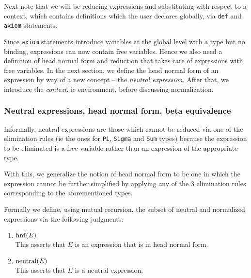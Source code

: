 \documentclass{article}
\begin{document}
Next note that we will be reducing expressions and substituting with
respect to a context, which contains definitions which the user declares
globally, via \verb|def| and \verb|axiom| statements.

Since \verb|axiom| statements introduce variables at the global level with a
type but no binding, expressions can now contain free variables.
Hence we also need a definition of head normal form and reduction
that takes care of expressions with free variables.
In the next section, we define the head normal form of an expression by way of
a new concept -- the \textit{neutral expression}.
After that, we introduce the \textit{context}, ie environment, before 
discussing normalization.





\subsubsection{Neutral expressions, head normal form, beta equivalence}
Informally, neutral expressions are those which cannot be reduced via one of the 
elimination rules (ie the ones for \verb|Pi|, \verb|Sigma| and \verb|Sum| types)
because  the expression to be eliminated is a free variable rather than an
expression of the appropriate type.

With this, we generalize the notion of head normal form to be one in which
the expression cannot be further simplified by applying any of the 3
elimination rules corresponding to the aforementioned types.

Formally we define, using mutual recursion, the subset of neutral and 
normalized expressions via the following judgments:
\begin{enumerate}
  \item $\operatorname{hnf}(E)$ \\
    This asserts that $E$ is an expression that is in head normal form.
  
  \item $\operatorname{neutral}(E)$ \\
    This asserts that $E$ is a neutral expression.
\end{enumerate}
\end{document}
